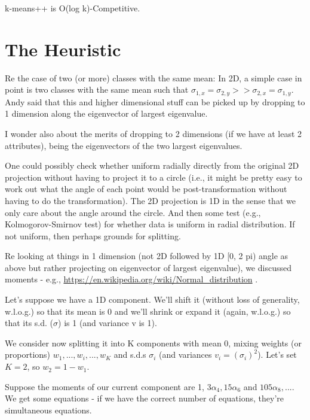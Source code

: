 \documentclass{elsarticle}
\begin{document}
k-means++ is O(log k)-Competitive.

\section{The Heuristic}

Re the case of two (or more) classes with the same mean:
In 2D, a simple case in point is two classes with the same mean
such that $\sigma_{1, x} = \sigma_{2, y} >> \sigma_{2, x} = \sigma_{1, y}$.
Andy said that this and higher dimensional stuff can be picked up
by dropping to 1 dimension along the eigenvector of largest eigenvalue.


I wonder also about the merits of dropping to 2 dimensions (if we have at least 2 attributes), being the eigenvectors of the two largest eigenvalues. 

One could possibly check whether uniform radially directly from the original 2D projection without having to project it to a circle (i.e., it might be pretty easy to work out what the angle of each point would be post-transformation without having to do the transformation).  The 2D projection is 1D in the sense that we only care about the angle around the circle.  And then some test (e.g., Kolmogorov-Smirnov test) for whether data is uniform in radial distribution.  If not uniform, then perhaps grounds for splitting.

Re looking at things in 1 dimension (not 2D followed by 1D [0, 2 pi) angle
as above but rather projecting on eigenvector of largest eigenvalue), we
discussed moments - e.g., \url{https://en.wikipedia.org/wiki/Normal_distribution} .


Let's suppose we have a 1D component.  We'll shift it (without loss of
generality, w.l.o.g.) so that its mean is 0 and we'll shrink or expand it
(again, w.l.o.g.) so that its s.d. ($\sigma$) is 1 (and variance v is 1).

We consider now splitting it into K components with mean 0,
mixing weights (or proportions) $w_1, ..., w_i, ..., w_K$ and s.d.s $\sigma_i$ (and variances $v_i = (\sigma_i)^2$).
Let's set $K = 2$, so $w_2 = 1 - w_1$.

Suppose the moments of our current component are 1, $3 \alpha_4, 15 \alpha_6$ and $105 \alpha_8, ... $.
We get some equations - if we have the correct number of equations,
they're simultaneous equations.
\end{document}
